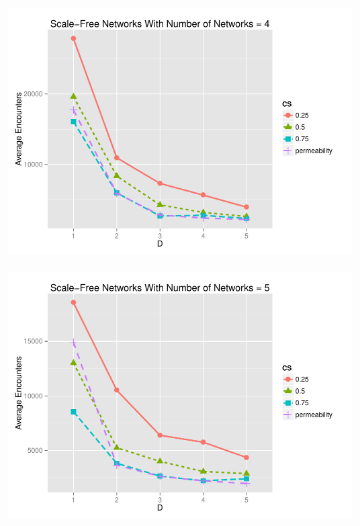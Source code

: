 \documentclass[preprint,number]{elsarticle}
\begin{document}
\begin{figure}[H]
\begin{subfigure}{.49\linewidth}
		\includegraphics[width=1\linewidth]{"../analysis/pdf/context_switching_encounters_comp_sf_groupedbynets_4"}
		\caption{}
		\label{fig:ctx_switching_comp_sf_4}
	\end{subfigure}
	\begin{subfigure}{.5\linewidth}
		\centering
		\includegraphics[width=1\linewidth]{"../analysis/pdf/context_switching_encounters_comp_sf_groupedbynets_5"}
		\caption{}
		\label{fig:ctx_switching_comp_sf_5}
	\end{subfigure}
	\begin{minipage}{0.9\textwidth}
		\vspace{0.2cm}
		\caption{}
		\label{fig:ctx_switching_comp_sf}
	\end{minipage}
\end{figure}
\end{document}
